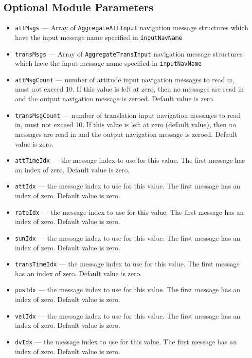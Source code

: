 \subsection{Optional Module Parameters}
\begin{itemize}
	\item {\tt attMsgs} --- Array of {\tt AggregateAttInput} navigation message structures which have the input message name specified in {\tt inputNavName}
	\item {\tt transMsgs} --- Array of {\tt AggregateTransInput} navigation message structures which have the input message name specified in {\tt inputNavName}
	\item {\tt attMsgCount} --- number of attitude input navigation messages to read in, must not exceed 10.  If this value is left at zero, then no messages are read in and the output navigation message is zeroed. Default value is zero.
	\item {\tt transMsgCount} --- number of translation input navigation messages to read in, must not exceed 10.  If this value is left at zero (default value), then no messages are read in and the output navigation message is zeroed.  Default value is zero.
	\item {\tt attTimeIdx} --- the message index to use for this value.  The first message has an index of zero. Default value is zero.
	\item {\tt attIdx} --- the message index to use for this value.  The first message has an index of zero. Default value is zero.
	\item {\tt rateIdx} --- the message index to use for this value.  The first message has an index of zero. Default value is zero.
	\item {\tt sunIdx} --- the message index to use for this value.  The first message has an index of zero. Default value is zero.
	\item {\tt transTimeIdx} --- the message index to use for this value.  The first message has an index of zero. Default value is zero.
	\item {\tt posIdx} --- the message index to use for this value.  The first message has an index of zero. Default value is zero.
	\item {\tt velIdx} --- the message index to use for this value.  The first message has an index of zero. Default value is zero.
	\item {\tt dvIdx} --- the message index to use for this value.  The first message has an index of zero. Default value is zero.
\end{itemize}
